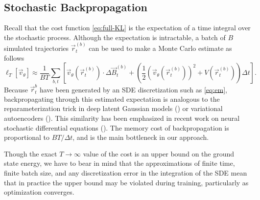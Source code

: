 \documentclass[12pt]{msml2020} %
\begin{document}
\subsection{Stochastic Backpropagation}

Recall that the cost function \eqref{eq:full-KL} is the expectation of a time integral over the stochastic process. Although the expectation is intractable, a batch of $B$ simulated trajectories $\vec{r}^{(b)}_{t}$ can be used to make a Monte Carlo estimate as follows 
%
\begin{equation}\label{eq:cost-est}
    \ell_T[\vec{v}_\theta] \approx \frac{1}{B T} \sum_{b,t}\left[\vec{v}_\theta\left(\vec{r}^{(b)}_t\right)\cdot \Delta\vec{B}^{(b)}_t + \left(\frac{1}{2}\left(\vec{v}_\theta\left(\vec{r}^{(b)}_t\right)\right)^2 + V\left(\vec{r}^{(b)}_t\right) \right)\Delta t \right ].
\end{equation}
%
Because $\vec{r}^{b}_{t}$ have been generated by an SDE discretization such as \eqref{eq:em}, backpropagating through this estimated expectation is analogous to the reparameterization trick in deep latent Gaussian models (\cite{Rezende:2014aa}) or variational autoencoders (\cite{Kingma:2013aa}). This similarity has been emphasized in recent work on neural stochastic differential equations (\cite{Tzen:2019aa}). The memory cost of backpropagation is proportional to $BT/\Delta t$, and is the main bottleneck in our approach. 

Though the exact $T\to\infty$ value of the cost is an upper bound on the ground state energy, we have to bear in mind that the approximations of finite time, finite batch size, and any discretization error in the integration of the SDE mean that in practice the upper bound may be violated during training, particularly as optimization converges.




\end{document}

